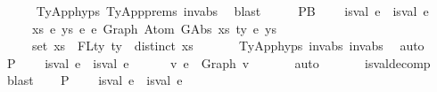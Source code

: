 \begin{isabellebody}
\ \ \ \ \isamarkupfalse%
\ TyApp{\isachardot}{\kern0pt}hyps{\isacharparenleft}{\kern0pt}{}{\isacharparenright}{\kern0pt}\ TyApp{\isachardot}{\kern0pt}prems\ inv{\isacharunderscore}{\kern0pt}abs{}\ \isamarkupfalse%
\ blast\isanewline
\ \ \isamarkupfalse%
\ \isamarkupfalse%
\ P{}B{\isacharcolon}{\kern0pt}\isanewline
\ \ \ \ {\isachardoublequoteopen}{\isacharparenleft}{\kern0pt}is{\isacharunderscore}{\kern0pt}val\ e{}\ {\isasymand}\ is{\isacharunderscore}{\kern0pt}val\ e{}{\isacharparenright}{\kern0pt}\ {\isacharequal}{\kern0pt}{\isacharequal}{\kern0pt}{\isachargreater}{\kern0pt}\isanewline
\ \ \ \ \ {\isasymforall}xs\ e{\isacharprime}{\kern0pt}\ ys{\isachardot}{\kern0pt}\ e{}\ {\isasymsimeq}e\ Graph\ {\isacharparenleft}{\kern0pt}Atom\ {\isacharparenleft}{\kern0pt}GAbs\ xs\ ty{}\ e{\isacharprime}{\kern0pt}{\isacharparenright}{\kern0pt}\ ys{\isacharparenright}{\kern0pt}\ {\isacharminus}{\kern0pt}{\isacharminus}{\kern0pt}{\isachargreater}{\kern0pt}\isanewline
\ \ \ \ \ set\ xs\ {\isacharequal}{\kern0pt}\ FLty\ ty{}\ {\isasymand}\ distinct\ xs{\isachardoublequoteclose}\isanewline
\ \ \ \ \ \isamarkupfalse%
\ TyApp{\isachardot}{\kern0pt}hyps{\isacharparenleft}{\kern0pt}{}{\isacharparenright}{\kern0pt}\ inv{\isacharunderscore}{\kern0pt}abs{}\ inv{\isacharunderscore}{\kern0pt}abs{}\ \isamarkupfalse%
\ auto\isanewline
\ \ \isamarkupfalse%
\ P{}{\isacharcolon}{\kern0pt}\isanewline
\ \ \ \ {\isachardoublequoteopen}{\isacharparenleft}{\kern0pt}is{\isacharunderscore}{\kern0pt}val\ e{}\ {\isasymand}\ is{\isacharunderscore}{\kern0pt}val\ e{}{\isacharparenright}{\kern0pt}\ {\isacharequal}{\kern0pt}{\isacharequal}{\kern0pt}{\isachargreater}{\kern0pt}\isanewline
\ \ \ \ \ {\isasymexists}v{\isachardot}{\kern0pt}\ e{}\ {\isacharequal}{\kern0pt}\ Graph\ v{\isachardoublequoteclose}\isanewline
\ \ \ \ \ \isamarkupfalse%
\ auto\isanewline
\ \ \ \ \ \isamarkupfalse%
\ is{\isacharunderscore}{\kern0pt}val{\isacharunderscore}{\kern0pt}decomp\ \isamarkupfalse%
\ blast\isanewline
\ \ \isamarkupfalse%
\ P{}{\isacharcolon}{\kern0pt}\isanewline
\ \ \ \ {\isachardoublequoteopen}{\isacharparenleft}{\kern0pt}is{\isacharunderscore}{\kern0pt}val\ e{}\ {\isasymand}\ is{\isacharunderscore}{\kern0pt}val\ e{}{\isacharparenright}{\kern0pt}\ {\isacharequal}{\kern0pt}{\isacharequal}{\kern0pt}{\isachargreater}{\kern0pt}\isanewline

\end{isabellebody}
